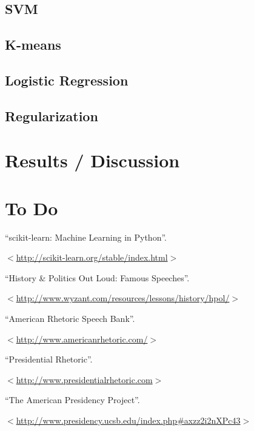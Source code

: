 \documentclass[twocolumn]{article}
\begin{document}
\subsection{SVM}

\subsection{K-means}

\subsection{Logistic Regression}

\subsection{Regularization}

\section{Results / Discussion}

\section{To Do}

\begin{thebibliography}{9}

  ``scikit-learn: Machine Learning in Python''.
  
  $<$\url{http://scikit-learn.org/stable/index.html}$>$

  ``History \& Politics Out Loud: Famous Speeches''.
  
  $<$\url{http://www.wyzant.com/resources/lessons/history/hpol/}$>$
  
  ``American Rhetoric Speech Bank''.
  
  $<$\url{http://www.americanrhetoric.com/}$>$

  ``Presidential Rhetoric''.
  
  $<$\url{http://www.presidentialrhetoric.com}$>$

  ``The American Presidency Project''.
  
  $<$\url{http://www.presidency.ucsb.edu/index.php#axzz2i2nXPc43}$>$


\end{thebibliography}
\end{document}
